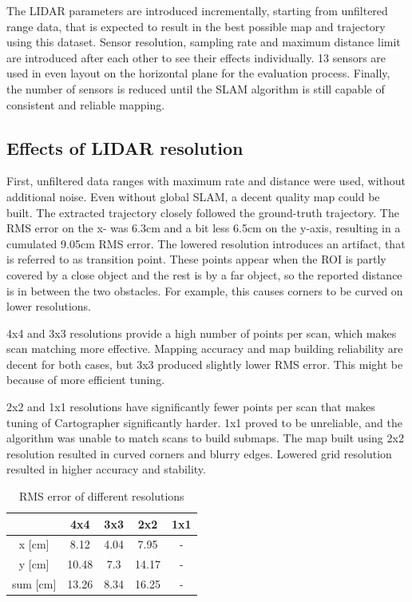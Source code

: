 \documentclass[conference]{IEEEtran}
\begin{document}
The LIDAR parameters are introduced incrementally, starting from unfiltered range data, that is expected to 
result in the best possible map and trajectory using this dataset. Sensor resolution, sampling rate and 
maximum distance limit are introduced after each other to see their effects individually. 13 sensors are used
in even layout on the horizontal plane for the evaluation process. Finally, the number of sensors is reduced
until the SLAM algorithm is still capable of consistent and reliable mapping.

\subsection{Effects of LIDAR resolution}

First, unfiltered data ranges with maximum rate and distance were used, without additional noise.
Even without global SLAM, a decent quality map could be built. The extracted trajectory closely followed 
the ground-truth trajectory. The RMS error on the x- was 6.3cm and a bit less 6.5cm on the y-axis, resulting 
in a cumulated 9.05cm RMS error. The lowered resolution introduces an artifact, that is referred to as transition
point. These points appear when the ROI is partly covered by a close object and the rest is by a far object, so 
the reported distance is in between the two obstacles. For example, this causes corners to be curved on lower 
resolutions.

4x4 and 3x3 resolutions provide a high number of points per scan, which makes scan matching more effective. 
Mapping accuracy and map building reliability are decent for both cases, but 3x3 produced slightly lower RMS error.
This might be because of more efficient tuning. 

2x2 and 1x1 resolutions have significantly fewer points per scan that makes tuning of Cartographer significantly 
harder. 1x1 proved to be unreliable, and the algorithm was unable to match scans to build submaps. 
The map built using 2x2 resolution resulted in curved corners and blurry edges. Lowered grid resolution 
resulted in higher accuracy and stability.

\begin{table}[!t]
\renewcommand{\arraystretch}{1.3}
\caption{RMS error of different resolutions}
\label{table_resolution}
\centering
\begin{tabular}{|c||c|c|c|c|}
\hline
  & 4x4 & 3x3 & 2x2 & 1x1\\
\hline
\hline
x [cm] & 8.12 & 4.04 & 7.95 & -\\
\hline
y [cm]& 10.48 & 7.3& 14.17& -\\
\hline
sum [cm]& 13.26 & 8.34 & 16.25& -\\
\hline
\end{tabular}
\end{table}
\end{document}

